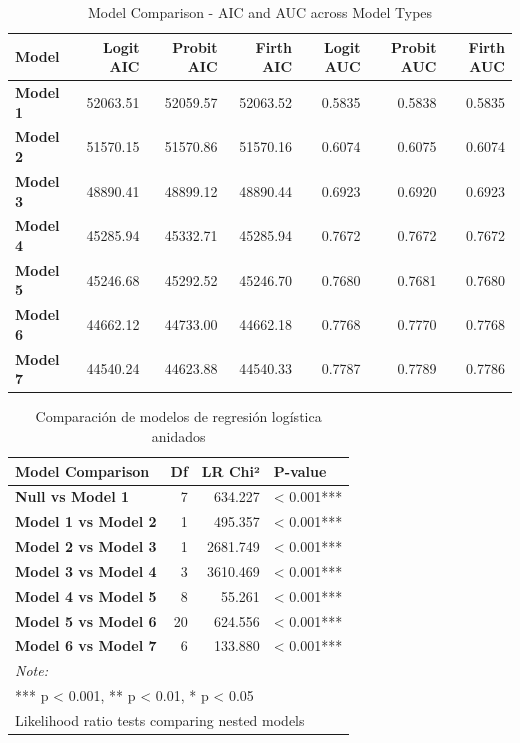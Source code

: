 \documentclass[
  spanish,
  10pt,
]{article}
\begin{document}
\begin{table}[H]
\centering
\caption{\label{tab:unnamed-chunk-8}Model Comparison - AIC and AUC across Model Types}
\centering
\fontsize{9}{11}\selectfont
\begin{tabular}[t]{>{}lrrrrrr}
\toprule
Model & Logit AIC & Probit AIC & Firth AIC & Logit AUC & Probit AUC & Firth AUC\\
\midrule
\textbf{Model 1} & 52063.51 & 52059.57 & 52063.52 & 0.5835 & 0.5838 & 0.5835\\
\textbf{Model 2} & 51570.15 & 51570.86 & 51570.16 & 0.6074 & 0.6075 & 0.6074\\
\textbf{Model 3} & 48890.41 & 48899.12 & 48890.44 & 0.6923 & 0.6920 & 0.6923\\
\textbf{Model 4} & 45285.94 & 45332.71 & 45285.94 & 0.7672 & 0.7672 & 0.7672\\
\textbf{Model 5} & 45246.68 & 45292.52 & 45246.70 & 0.7680 & 0.7681 & 0.7680\\
\addlinespace
\textbf{Model 6} & 44662.12 & 44733.00 & 44662.18 & 0.7768 & 0.7770 & 0.7768\\
\textbf{Model 7} & 44540.24 & 44623.88 & 44540.33 & 0.7787 & 0.7789 & 0.7786\\
\bottomrule
\end{tabular}
\end{table}

\begin{table}[H]
\centering
\caption{\label{tab:unnamed-chunk-9}Comparación de modelos de regresión logística anidados}
\centering
\fontsize{9}{11}\selectfont
\begin{tabular}[t]{>{}lrrl}
\toprule
Model Comparison & Df & LR Chi² & P-value\\
\midrule
\textbf{Null vs Model 1} & 7 & 634.227 & < 0.001***\\
\textbf{Model 1 vs Model 2} & 1 & 495.357 & < 0.001***\\
\textbf{Model 2 vs Model 3} & 1 & 2681.749 & < 0.001***\\
\textbf{Model 3 vs Model 4} & 3 & 3610.469 & < 0.001***\\
\textbf{Model 4 vs Model 5} & 8 & 55.261 & < 0.001***\\
\addlinespace
\textbf{Model 5 vs Model 6} & 20 & 624.556 & < 0.001***\\
\textbf{Model 6 vs Model 7} & 6 & 133.880 & < 0.001***\\
\bottomrule
\multicolumn{4}{l}{\rule{0pt}{1em}\textit{Note: }}\\
\multicolumn{4}{l}{\rule{0pt}{1em}*** p < 0.001, ** p < 0.01, * p < 0.05}\\
\multicolumn{4}{l}{\rule{0pt}{1em}Likelihood ratio tests comparing nested models}\\
\end{tabular}
\end{table}
\end{document}

